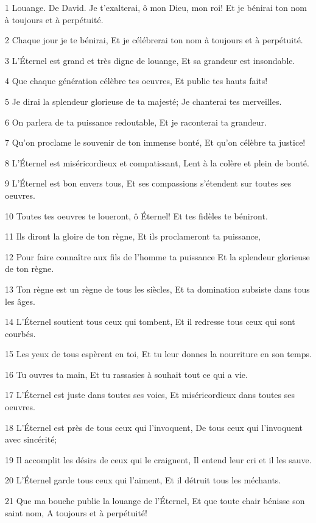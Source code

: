 \par 1 Louange. De David. Je t'exalterai, ô mon Dieu, mon roi! Et je bénirai ton nom à toujours et à perpétuité.
\par 2 Chaque jour je te bénirai, Et je célébrerai ton nom à toujours et à perpétuité.
\par 3 L'Éternel est grand et très digne de louange, Et sa grandeur est insondable.
\par 4 Que chaque génération célèbre tes oeuvres, Et publie tes hauts faits!
\par 5 Je dirai la splendeur glorieuse de ta majesté; Je chanterai tes merveilles.
\par 6 On parlera de ta puissance redoutable, Et je raconterai ta grandeur.
\par 7 Qu'on proclame le souvenir de ton immense bonté, Et qu'on célèbre ta justice!
\par 8 L'Éternel est miséricordieux et compatissant, Lent à la colère et plein de bonté.
\par 9 L'Éternel est bon envers tous, Et ses compassions s'étendent sur toutes ses oeuvres.
\par 10 Toutes tes oeuvres te loueront, ô Éternel! Et tes fidèles te béniront.
\par 11 Ils diront la gloire de ton règne, Et ils proclameront ta puissance,
\par 12 Pour faire connaître aux fils de l'homme ta puissance Et la splendeur glorieuse de ton règne.
\par 13 Ton règne est un règne de tous les siècles, Et ta domination subsiste dans tous les âges.
\par 14 L'Éternel soutient tous ceux qui tombent, Et il redresse tous ceux qui sont courbés.
\par 15 Les yeux de tous espèrent en toi, Et tu leur donnes la nourriture en son temps.
\par 16 Tu ouvres ta main, Et tu rassasies à souhait tout ce qui a vie.
\par 17 L'Éternel est juste dans toutes ses voies, Et miséricordieux dans toutes ses oeuvres.
\par 18 L'Éternel est près de tous ceux qui l'invoquent, De tous ceux qui l'invoquent avec sincérité;
\par 19 Il accomplit les désirs de ceux qui le craignent, Il entend leur cri et il les sauve.
\par 20 L'Éternel garde tous ceux qui l'aiment, Et il détruit tous les méchants.
\par 21 Que ma bouche publie la louange de l'Éternel, Et que toute chair bénisse son saint nom, A toujours et à perpétuité!

